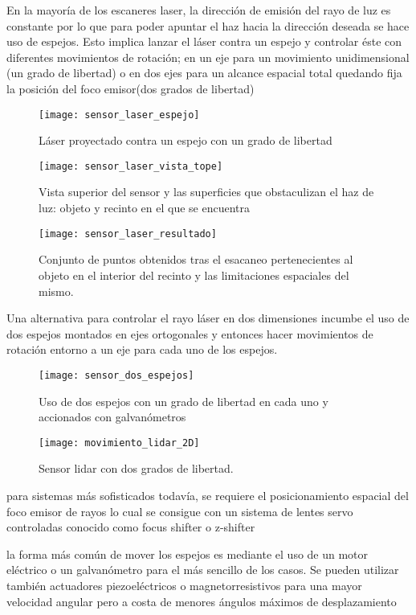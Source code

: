 En la mayoría de los escaneres laser, la dirección de emisión del rayo de luz es constante por lo que para poder apuntar el haz hacia la dirección deseada se hace uso de espejos. Esto implica lanzar el láser contra un espejo y controlar éste con diferentes movimientos de rotación; en un eje para un movimiento unidimensional (un grado de libertad) o en dos ejes para un alcance espacial total quedando fija la posición del foco emisor(dos grados de libertad)

\begin{figure}[!htb]
  \texttt{[image: sensor\_laser\_espejo]}
  \caption{Láser proyectado contra un espejo con un grado de libertad}\label{fig:sensor laser completo - espejo}
\endminipage\hfill
{}
  \texttt{[image: sensor\_laser\_vista\_tope]}
  \caption{Vista superior del sensor y las superficies que obstaculizan el haz de luz: objeto y recinto en el que se encuentra}\label{fig:sensor laser completo - vista tope}
\endminipage\hfill
{}
  \texttt{[image: sensor\_laser\_resultado]}
  \caption{Conjunto de puntos obtenidos tras el esacaneo pertenecientes al objeto en el interior del recinto y las limitaciones espaciales del mismo.}\label{fig:sensor laser completo - resultado}
\endminipage
\end{figure}

Una alternativa para controlar el rayo láser en dos dimensiones incumbe el uso de dos espejos montados en ejes ortogonales y entonces hacer movimientos de rotación entorno a un eje para cada uno de los espejos.

\begin{figure}
  \texttt{[image: sensor\_dos\_espejos]}
  \caption{Uso de dos espejos con un grado de libertad en cada uno y accionados con galvanómetros}\label{fig:sensor dos espejos}
\endminipage\hfill
{}
  \texttt{[image: movimiento\_lidar\_2D]}
  \caption{Sensor lidar con dos grados de libertad.}\label{fig:movimiento lidar 2D}
\endminipage\hfill

\end{figure}


para sistemas más sofisticados todavía, se requiere el posicionamiento espacial del foco emisor de rayos lo cual se consigue con un sistema de lentes servo controladas conocido como focus shifter o z-shifter

la forma más común de mover los espejos es mediante el uso de un motor eléctrico o un galvanómetro para el más sencillo de los casos. Se pueden utilizar también actuadores piezoeléctricos o magnetorresistivos para una mayor velocidad angular pero a costa de menores ángulos máximos de desplazamiento

